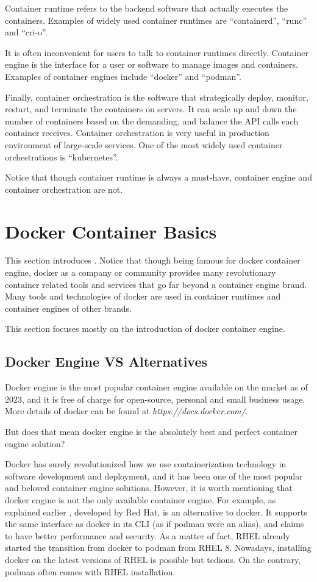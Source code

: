 Container runtime refers to the backend software that actually executes the containers. Examples of widely used container runtimes are ``containerd'', ``runc'' and ``cri-o''. 

It is often inconvenient for users to talk to container runtimes directly. Container engine is the interface for a user or software to manage images and containers. Examples of container engines include ``docker'' and ``podman''. 

Finally, container orchestration is the software that strategically deploy, monitor, restart, and terminate the containers on servers. It can scale up and down the number of containers based on the demanding, and balance the API calls each container receives. Container orchestration is very useful in production environment of large-scale services. One of the most widely used container orchestrations is ``kubernetes''.

Notice that though container runtime is always a must-have, container engine and container orchestration are not.

\section{Docker Container Basics} \label{ch:vac:sec:dc}

This section introduces . Notice that though being famous for docker container engine, docker as a company or community provides many revolutionary container related tools and services that go far beyond a container engine brand. Many tools and technologies of docker are used in container runtimes and container engines of other brands.

This section focuses mostly on the introduction of docker container engine.

\subsection{Docker Engine VS Alternatives}

Docker engine is the most popular container engine available on the market as of 2023, and it is free of charge for open-source, personal and small business usage. More details of docker can be found at \textit{https://docs.docker.com/}.

But does that mean docker engine is the absolutely best and perfect container engine solution?

Docker has surely revolutionized how we use containerization technology in software development and deployment, and it has been one of the most popular and beloved container engine solutions. However, it is worth mentioning that docker engine is not the only available container engine. For example, as explained earlier , developed by Red Hat, is an alternative to docker. It supports the same interface as docker in its CLI (as if podman were an alias), and claims to have better performance and security. As a matter of fact, RHEL already started the transition from docker to podman from RHEL 8. Nowadays, installing docker on the latest versions of RHEL is possible but tedious. On the contrary, podman often comes with RHEL installation.


